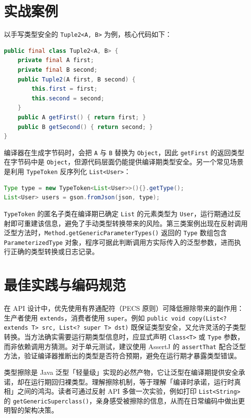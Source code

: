 \chapter{实战案例}
以手写类型安全的 \texttt{Tuple2<A, B>} 为例，核心代码如下：\par
\begin{lstlisting}[language=java]
public final class Tuple2<A, B> {
    private final A first;
    private final B second;
    public Tuple2(A first, B second) {
        this.first = first;
        this.second = second;
    }
    public A getFirst() { return first; }
    public B getSecond() { return second; }
}
\end{lstlisting}
编译器在生成字节码时，会把 \texttt{A} 与 \texttt{B} 替换为 \texttt{Object}，因此 \texttt{getFirst} 的返回类型在字节码中是 \texttt{Object}，但源代码层面仍能提供编译期类型安全。另一个常见场景是利用 \texttt{TypeToken} 反序列化 \texttt{List<User>}：\par
\begin{lstlisting}[language=java]
Type type = new TypeToken<List<User>>(){}.getType();
List<User> users = gson.fromJson(json, type);
\end{lstlisting}
\texttt{TypeToken} 的匿名子类在编译期已确定 \texttt{List} 的元素类型为 \texttt{User}，运行期通过反射即可重建该信息，避免了手动类型转换带来的风险。第三类案例出现在反射调用泛型方法时，\texttt{Method.getGenericParameterTypes()} 返回的 \texttt{Type} 数组包含 \texttt{ParameterizedType} 对象，程序可据此判断调用方实际传入的泛型参数，进而执行正确的类型转换或日志记录。\par
\chapter{最佳实践与编码规范}
在 API 设计中，优先使用有界通配符（PECS 原则）可降低擦除带来的副作用：生产者使用 \texttt{extends}，消费者使用 \texttt{super}。例如 \texttt{public void copy(List<? extends T> src, List<? super T> dst)} 既保证类型安全，又允许灵活的子类型转换。当方法确实需要运行期类型信息时，应显式声明 \texttt{Class<T>} 或 \texttt{Type} 参数，而非依赖调用方猜测。对于单元测试，建议使用 AssertJ 的 \texttt{assertThat} 配合泛型方法，验证编译器推断出的类型是否符合预期，避免在运行期才暴露类型错误。\par
类型擦除是 Java 泛型「轻量级」实现的必然产物，它让泛型在编译期提供安全承诺，却在运行期回归裸类型。理解擦除机制，等于理解「编译时承诺，运行时真相」之间的鸿沟。读者可通过反射 API 多做一次实验，例如打印 \texttt{List<String>} 的 \texttt{getGenericSuperclass()}，亲身感受被擦除的信息，从而在日常编码中做出更明智的架构决策。\par
